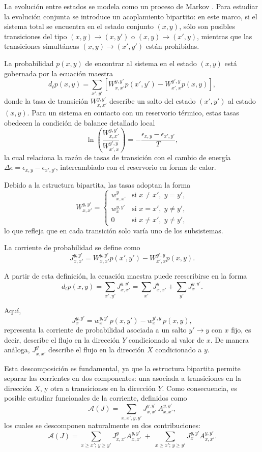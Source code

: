La evolución entre estados se modela como un proceso de Markov \cite{van1992stochastic}. Para estudiar la evolución conjunta se introduce un acoplamiento bipartito: en este marco, si el sistema total se encuentra en el estado conjunto \((x,y)\), sólo son posibles transiciones del tipo \((x,y)\to(x,y')\) o \((x,y)\to(x',y)\), mientras que las transiciones simultáneas \((x,y)\to(x',y')\) están prohibidas.

La probabilidad \( p(x,y) \) de encontrar al sistema en el estado \((x,y)\) está gobernada por la ecuación maestra
\[
d_{t}p(x,y) = \sum_{x',y'} \left[ W_{x,x'}^{y,y'}p(x',y') - W_{x',x}^{y',y}p(x,y) \right],
\]
donde la tasa de transición \( W_{x,x'}^{y,y'} \) describe un salto del estado \((x',y')\) al estado \((x,y)\). Para un sistema en contacto con un reservorio térmico, estas tasas obedecen la condición de balance detallado local
\[
\ln \left( \frac{W_{x,x'}^{y,y'}}{W_{x',x}^{y',y}} \right) = -\frac{\epsilon_{x,y}-\epsilon_{x',y'}}{T},
\]
la cual relaciona la razón de tasas de transición con el cambio de energía \(\Delta \epsilon = \epsilon_{x,y}-\epsilon_{x',y'}\), intercambiado con el reservorio en forma de calor. 

Debido a la estructura bipartita, las tasas adoptan la forma
\[
W_{x,x'}^{y,y'} = 
\begin{cases}
w_{x,x'}^{y} & \text{si } x\neq x', \; y=y', \\[2mm]
w_{x}^{y,y'} & \text{si } x=x', \; y\neq y', \\[2mm]
0 & \text{si } x\neq x', \; y\neq y',
\end{cases}
\]
lo que refleja que en cada transición solo varía uno de los subsistemas.

La corriente de probabilidad se define como
\[
J_{x,x'}^{y,y'} = W_{x,x'}^{y,y'}p(x',y') - W_{x',x}^{y',y}p(x,y).
\]

A partir de esta definición, la ecuación maestra puede reescribirse en la forma
\[
d_{t}p(x,y) = \sum_{x',y'}J_{x,x'}^{y,y'} = \sum_{x'}J_{x,x'}^{y} + \sum_{y'}J_{x}^{y,y'}.
\]

Aquí,
\[
J_{x}^{y,y'} = w_{x}^{y,y'}\,p(x,y') - w_{x}^{y',y}\,p(x,y),
\]
representa la corriente de probabilidad asociada a un salto \(y' \to y\) con \(x\) fijo, es decir, describe el flujo en la dirección \( Y \) condicionado al valor de \(x\). De manera análoga, \( J^{y}_{x,x'} \) describe el flujo en la dirección \( X \) condicionado a \(y\).  

Esta descomposición es fundamental, ya que la estructura bipartita permite separar las corrientes en dos componentes: una asociada a transiciones en la dirección \(X\), y otra a transiciones en la dirección \(Y\). Como consecuencia, es posible estudiar funcionales de la corriente, definidos como
\[
\mathcal{A}(J) = \sum_{x,x',y,y'} J_{x,x'}^{y,y'}\, A_{x,x'}^{y,y'},
\]
los cuales se descomponen naturalmente en dos contribuciones:
\begin{equation}
\mathcal{A}(J) = \sum_{x\geq x';\,y\geq y'} J_{x,x'}^{y}A_{x,x'}^{y,y'} \;+\; \sum_{x\geq x';\,y\geq y'} J_{x}^{y,y'} A_{x,x'}^{y,y'}.
\label{sec4:functionalcurrent}
\end{equation}

